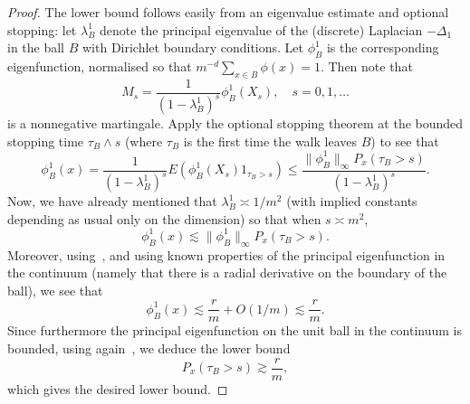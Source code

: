 \documentclass[AHL, Unicode, longabstracts, published]{cedram}
\newcommand{\Pmh}{P}
\newcommand*\E {{E}}
\begin{document}
\begin{proof}
The lower bound follows easily from an eigenvalue estimate and optional stopping: let $\lambda^1_B$ denote the principal eigenvalue of the (discrete) Laplacian $-\Delta_1$ in the ball $B$ with Dirichlet boundary conditions. Let $\phi^1_B$ is the corresponding eigenfunction, normalised so that $m^{-d} \sum_{x \in B} \phi(x) = 1$.
Then note that
\[
M_s = \frac{1}{(1-\lambda_B^1)^s} \phi_B^1 (X_s),\quad s = 0, 1, \ldots
\]
is a nonnegative martingale. Apply the optional stopping theorem at the bounded stopping time $\tau_B \wedge s$ (where $\tau_B$ is the first time the walk leaves $B$) to see that
\[
\phi_B^1 (x) = \frac1{(1- \lambda_B^1)^s} \E\left(\phi_B^1(X_s) 1_{\tau_B > s}\right)\le \frac{\| \phi_B^1\|_\infty \Pmh_x(\tau_B > s)}{ (1- \lambda_B^1)^s}.
\]
Now, we have already mentioned that $\lambda_B^1 \asymp 1/m^2$ (with implied constants depending as usual only on the dimension) so that when $s \asymp m^2$,
\[
\phi_B^1 (x) \lesssim \| \phi_B^1\|_\infty \Pmh_x(\tau_B > s).
\]
Moreover, using~\cite[Lemma~2.1]{BO}, and using known properties of the principal eigenfunction in the continuum (namely that there is a radial derivative on the boundary of the ball), we see that
\[
\phi_B^1 (x) \lesssim \frac{r }{ m} + O(1/m) \lesssim \frac{r }{ m}.
\]
Since furthermore the principal eigenfunction on the unit ball in the continuum is bounded, using again~\cite[Lemma~2.1]{BO}, we deduce the lower bound
\begin{equation}\label{Tball}
\Pmh_x (\tau_B > s) \gtrsim \frac{r }{ m},
\end{equation}
which gives the desired lower bound.


\end{proof}
\end{document}
